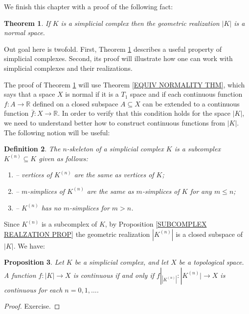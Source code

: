 \documentclass[11pt, letterpaper, oneside]{report}
\theoremstyle{pplain}
\newtheorem{theorem}{Theorem}[chapter]
\newtheorem{proposition}[theorem]{Proposition}
\newtheorem{ITERMVALUE THM}[theorem]{Intermediate Value Theorem}
\newtheorem{HEINEBOREL THM}[theorem]{Heine-Borel Theorem}
\newtheorem{UMETR THM}[theorem]{Urysohn Metrization Theorem}
\newtheorem{UMETR2 THM}[theorem]{Urysohn Metrization Theorem (v.2)}
\theoremstyle{ddefinition}
\newtheorem{definition}[theorem]{Definition}
\theoremstyle{nnn}
\newtheorem{TDA NN}[theorem]{Topological Data Analysis. }
\theoremstyle{eexercise}
\newcommand{\R}{{\mathbb R}}
\newcommand{\benu}{\begin{enumerate}}
\newcommand{\eenu}{\end{enumerate}}
\begin{document}
We finish this chapter with a proof of the following fact:

\begin{theorem}
\label{REALIZATION IS NORMAL}
If $K$ is a simplicial complex then the geometric realization $|K|$ is a normal space. 
\end{theorem}

Out goal here is twofold. First, Theorem \ref{REALIZATION IS NORMAL} describes a useful property 
of simplicial complexes. Second, its proof will illustrate how one can work with simplicial complexes 
and their realizations. 

The proof of Theorem \ref{REALIZATION IS NORMAL} will use Theorem \ref{EQUIV NORMALITY THM},
which says that a space $X$ is normal if it is a $T_{1}$ space and if each continuous 
function $f\colon A\to \R$ defined on a closed subspace $A\subseteq X$ can be extended to 
a continuous function  $\bar{f}\colon X\to \R$. In order to verify that this condition holds for the space 
$|K|$,  we need to understand better how to construct continuous functions from $|K|$. The following notion will 
be useful:


\begin{definition}
\label{SKELETON DEF}
The \emph{$n$-skeleton}  of a simplicial complex $K$ is a subcomplex $K^{(n)}\subseteq K$ given as follows: 
\benu[leftmargin = *]
\item[--]  vertices of $K^{(n)}$  are the same as vertices of $K$;
\item[--]   $m$-simplices of $K^{(n)}$ are the same  as $m$-simplices of $K$ for any $m \leq n$;
\item[--] $K^{(n)} $ has no $m$-simplices for $m > n$.
\eenu
\end{definition}

Since $K^{(n)}$ is a subcomplex of $K$, by Proposition \ref{SUBCOMPLEX REALZATION PROP} 
the geometric realization $|K^{(n)}|$ is a closed subspace of $|K|$.  We have:

\begin{proposition}
\label{CONT FUNCTIONS BY SKELETA PROP}
Let $K$ be a simplicial complex, and let $X$ be a topological space. A function $f\colon |K| \to X$ is continuous 
if and only if $f|_{|K^{(n)}|} \colon |K^{(n)}| \to X$ is continuous for each $n = 0, 1, \dots$.  
\end{proposition}

\begin{proof}
Exercise.
\end{proof}
\end{document}
